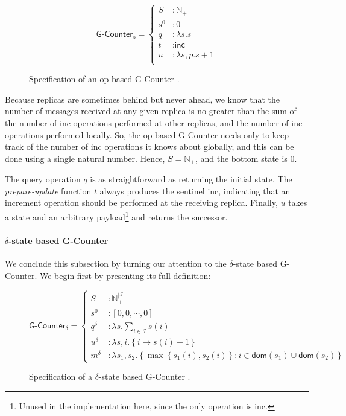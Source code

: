 \begin{figure}[H]
  \centering
  \[
    \textsf{G-Counter}_o = \left\{\begin{aligned}
      S &: \mathbb{N}_+ \\
      s^0 &: 0 \\
      q &: \lambda s. s \\
      t &: \textsf{inc} \\
      u &: \lambda s,p. s + 1 \\
    \end{aligned}\right.
  \]
  \caption{Specification of an op-based \textsf{G-Counter} \CRDT.}
\end{figure}

Because replicas are sometimes behind but never ahead, we know that the number
of messages received at any given replica is no greater than the sum of the
number of \textsf{inc} operations performed at other replicas, and the number of
\textsf{inc} operations performed locally. So, the op-based G-Counter needs only
to keep track of the number of \textsf{inc} operations it knows about globally,
and this can be done using a single natural number. Hence, $S = \mathbb{N}_+$,
and the bottom state is $0$.

The query operation $q$ is as straightforward as returning the initial state.
The \emph{prepare-update} function $t$ always produces the sentinel
\textsf{inc}, indicating that an increment operation should be performed at the
receiving replica. Finally, $u$ takes a state and an arbitrary
payload\footnote{Unused in the implementation here, since the only operation is
\textsf{inc}.} and returns the successor.

\paragraph{$\delta$-state based G-Counter}
We conclude this subsection by turning our attention to the $\delta$-state based
G-Counter. We begin first by presenting its full definition:

\begin{figure}[H]
  \centering
  \[
    \textsf{G-Counter}_\delta = \left\{\begin{aligned}
      S &: \mathbb{N}_+^{|\mathcal{I}|} \\
      s^0 &: \left[ 0, 0, \cdots, 0 \right] \\
      q^\delta &: \lambda s. \sum_{i \in \mathcal{I}} s(i) \\
      u^\delta &: \lambda s,i. \left\{ i \mapsto s(i) + 1 \right\} \\
      m^\delta &: \lambda s_1, s_2. \left\{ \max\left\{ s_1(i), s_2(i) \right\}: i \in \mathsf{dom}(s_1) \cup
      \mathsf{dom}(s_2) \right\}
    \end{aligned}\right.
  \]
  \caption{Specification of a $\delta$-state based \textsf{G-Counter} \CRDT.}
\end{figure}

